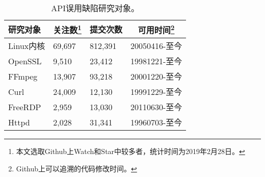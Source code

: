 \begin{table}[t]
	\centering
	\begin{minipage}[t]{0.9\linewidth} %
		\caption{API误用缺陷研究对象。}
		\label{tab:2-3-target}
		\begin{tabular}{lp{3cm}<{\centering}p{3cm}<{\centering}p{4cm}<{\centering}}
			\hline
			{\heiti 研究对象} & 
			\multicolumn{1}{c}{\heiti 关注数\footnote{本文选取Github上Watch和Star中较多者，统计时间为2019年2月28日。}} &
			\multicolumn{1}{c}{\heiti 提交次数} & 
			\multicolumn{1}{c}{\heiti 可用时间\footnote{Github上可以追溯的代码修改时间。}} \\
			\hline
			Linux内核   & 69,697 & 812,391 & 20050416-至今\\
			OpenSSL   & 9,510 & 23,412 & 19981221-至今\\
			FFmpeg   & 13,907 & 93,218 & 20001220-至今\\
			Curl   & 24,009 & 12,130 & 19991229-至今\\
			FreeRDP   & 2,959 & 13,030 & 20110630-至今\\
			Httpd   & 2,028 & 31,341 & 19960703-至今\\
			\hline
		\end{tabular}
	\end{minipage}
\end{table}
